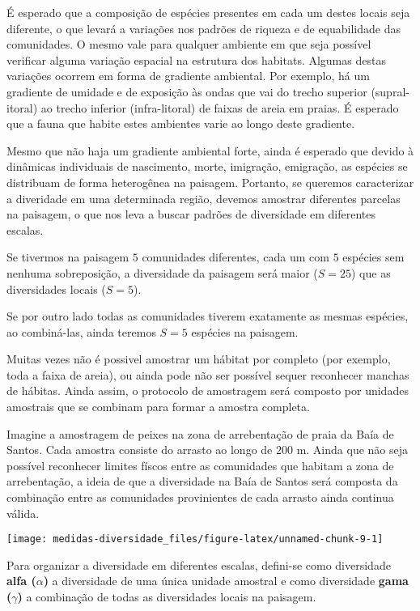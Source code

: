 \documentclass[
]{book}
\begin{document}
É esperado que a composição de espécies presentes em cada um destes locais seja diferente, o que levará a variações nos padrões de riqueza e de equabilidade das comunidades. O mesmo vale para qualquer ambiente em que seja possível verificar alguma variação espacial na estrutura dos habitats. Algumas destas variações ocorrem em forma de gradiente ambiental. Por exemplo, há um gradiente de umidade e de exposição às ondas que vai do trecho superior (supral-itoral) ao trecho inferior (infra-litoral) de faixas de areia em praias. É esperado que a fauna que habite estes ambientes varie ao longo deste gradiente.

Mesmo que não haja um gradiente ambiental forte, ainda é esperado que devido à dinâmicas individuais de nascimento, morte, imigração, emigração, as espécies se distribuam de forma heterogênea na paisagem. Portanto, se queremos caracterizar a diveridade em uma determinada região, devemos amostrar diferentes parcelas na paisagem, o que nos leva a buscar padrões de diversidade em diferentes escalas.

Se tivermos na paisagem \(5\) comunidades diferentes, cada um com \(5\) espécies sem nenhuma sobreposição, a diversidade da paisagem será maior (\(S = 25\)) que as diversidades locais (\(S = 5\)).

Se por outro lado todas as comunidades tiverem exatamente as mesmas espécies, ao combiná-las, ainda teremos \(S = 5\) espécies na paisagem.

Muitas vezes não é possivel amostrar um hábitat por completo (por exemplo, toda a faixa de areia), ou ainda pode não ser possível sequer reconhecer manchas de hábitas. Ainda assim, o protocolo de amostragem será composto por unidades amostrais que se combinam para formar a amostra completa.

Imagine a amostragem de peixes na zona de arrebentação de praia da Baía de Santos. Cada amostra consiste do arrasto ao longo de \(200\) m. Ainda que não seja possível reconhecer limites físcos entre as comunidades que habitam a zona de arrebentação, a ideia de que a diversidade na Baía de Santos será composta da combinação entre as comunidades provinientes de cada arrasto ainda continua válida.

\begin{center}\texttt{[image: medidas-diversidade\_files/figure-latex/unnamed-chunk-9-1]} \end{center}

Para organizar a diversidade em diferentes escalas, defini-se como diversidade \textbf{alfa (\(\alpha\))} a diversidade de uma única unidade amostral e como diversidade \textbf{gama (\(\gamma\))} a combinação de todas as diversidades locais na paisagem.
\end{document}

